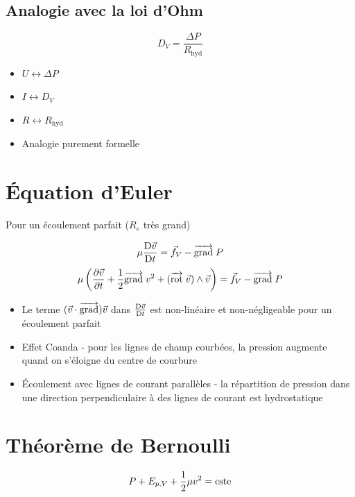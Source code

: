 \documentclass[openany]{book}
\begin{document}
\subsection{Analogie avec la loi d'Ohm}

\[ D_V = \frac{\Delta P}{R_{\text{hyd}}} \]

\begin{itemize}
    \item $U \longleftrightarrow \Delta P$
    \item $I \longleftrightarrow D_V$
    \item $R \longleftrightarrow R_{\text{hyd}}$
    \item Analogie purement formelle
\end{itemize}

\section{Équation d'Euler}
Pour un écoulement parfait ($R_e$ très grand)

\[ \mu \frac{\text{D} \vec{v}}{\text{D} t} = \vec{f}_{V} - \overrightarrow{{\text{grad}}} \; P \]
\[ \mu \left( \frac{\partial \vec{v}}{\partial t} + \frac{1}{2} \overrightarrow{{\text{grad}}} \; v^2 + (\overrightarrow{\text{rot}} \; \vec{v}) \wedge \vec{v} \right) = \vec{f}_V - \overrightarrow{{\text{grad}}} \; P \]

\begin{itemize}
    \item Le terme $(\vec{v}\cdot\overrightarrow{{\text{grad}}})\vec{v}$ dans $\frac{\text{D} \vec{v}}{\text{D} t}$ est non-linéaire et non-négligeable pour un écoulement parfait
    \item Effet Coanda - pour les lignes de champ courbées, la pression augmente quand on s'éloigne du centre de courbure
    \item Écoulement avec lignes de courant parallèles - la répartition de pression dans une direction perpendiculaire à des lignes de courant est hydrostatique 
\end{itemize}

\section{Théorème de Bernoulli}

\[ P + E_{p,V} + \frac{1}{2}\mu v^2 = \text{cste} \]
\end{document}
